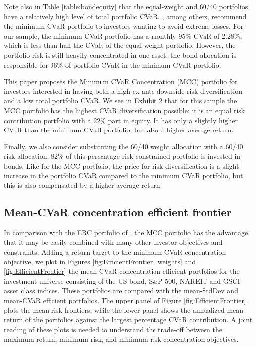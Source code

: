 \documentclass[12pt,a4paper]{article}
\begin{document}
Note also in Table \ref{table:bondequity} that the equal-weight and 60/40 portfolios have a relatively high level of total portfolio CVaR. \citet{Rockafellar2000}, among others, recommend the minimum CVaR portfolio to investors wanting to avoid extreme losses. For our sample, the minimum CVaR portfolio has a monthly 95\% CVaR of 2.28\%, which is less than half the CVaR of the equal-weight portfolio. However, the portfolio risk is still heavily concentrated in one asset: the bond allocation is responsible for 96\% of portfolio CVaR in the minimum CVaR portfolio.

This paper proposes the Minimum CVaR Concentration (MCC) portfolio for investors interested in having both a high ex ante downside risk diversification and a low total portfolio CVaR. We see in Exhibit 2 that for this sample the MCC portfolio has the highest CVaR diversification possible: it is an equal risk contribution portfolio with a 22\% part in equity. It has only a slightly higher CVaR than the minimum CVaR portfolio, but also a higher average return.

Finally, we also consider substituting the 60/40 weight allocation with a 60/40 risk allocation.  82\% of this percentage risk constrained portfolio is invested in bonds. Like for the MCC portfolio, the price for risk diversification is a slight increase in the portfolio CVaR compared to the minimum CVaR portfolio, but this is also compensated by a higher average return.


\subsection{Mean-CVaR concentration efficient frontier}\label{subsec:efficientfrontiers}


In comparison with the ERC portfolio of \citet{Qian2005}, the MCC portfolio has the advantage that it may be easily combined with many other investor objectives and constraints. Adding a return target to the minimum CVaR concentration objective, we plot in  Figures \ref{fig:EfficientFrontier_weights}  and \ref{fig:EfficientFrontier}  the mean-CVaR concentration efficient portfolios for the investment universe consisting of the US bond, S\&P 500, NAREIT and GSCI asset class indices. These portfolios are compared with the mean-StdDev and mean-CVaR efficient portfolios. The upper panel of Figure \ref{fig:EfficientFrontier} plots the mean-risk frontiers, while the lower panel shows the annualized mean return of the portfolios against the largest percentage CVaR contribution. A joint reading of these plots is needed to understand the trade-off between the maximum return, minimum risk, and minimum risk concentration objectives.
\end{document}
